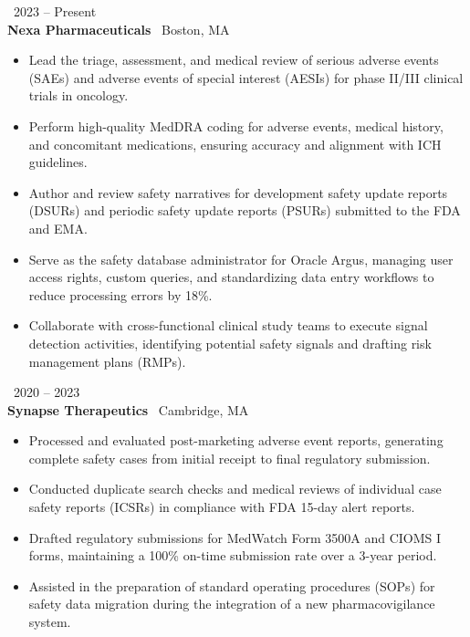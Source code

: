 \documentclass[10pt,oneside]{article}
\begin{document}
 \hfill {\color{secondaryColor}\small\faCalendar\ 2023 -- Present} \\
{\color{accentColor}\bfseries Nexa Pharmaceuticals} \hfill {\color{secondaryColor}\small\faMapMarker\ Boston, MA}
\begin{itemize}[leftmargin=1.2em, topsep=2pt, itemsep=2pt, parsep=0pt]
    \item Lead the triage, assessment, and medical review of serious adverse events (SAEs) and adverse events of special interest (AESIs) for phase II/III clinical trials in oncology.
    \item Perform high-quality MedDRA coding for adverse events, medical history, and concomitant medications, ensuring accuracy and alignment with ICH guidelines.
    \item Author and review safety narratives for development safety update reports (DSURs) and periodic safety update reports (PSURs) submitted to the FDA and EMA.
    \item Serve as the safety database administrator for Oracle Argus, managing user access rights, custom queries, and standardizing data entry workflows to reduce processing errors by 18\%.
    \item Collaborate with cross-functional clinical study teams to execute signal detection activities, identifying potential safety signals and drafting risk management plans (RMPs).
\end{itemize}

\vspace{5pt}

 \hfill {\color{secondaryColor}\small\faCalendar\ 2020 -- 2023} \\
{\color{accentColor}\bfseries Synapse Therapeutics} \hfill {\color{secondaryColor}\small\faMapMarker\ Cambridge, MA}
\begin{itemize}[leftmargin=1.2em, topsep=2pt, itemsep=2pt, parsep=0pt]
    \item Processed and evaluated post-marketing adverse event reports, generating complete safety cases from initial receipt to final regulatory submission.
    \item Conducted duplicate search checks and medical reviews of individual case safety reports (ICSRs) in compliance with FDA 15-day alert reports.
    \item Drafted regulatory submissions for MedWatch Form 3500A and CIOMS I forms, maintaining a 100\% on-time submission rate over a 3-year period.
    \item Assisted in the preparation of standard operating procedures (SOPs) for safety data migration during the integration of a new pharmacovigilance system.
\end{itemize}
\end{document}
